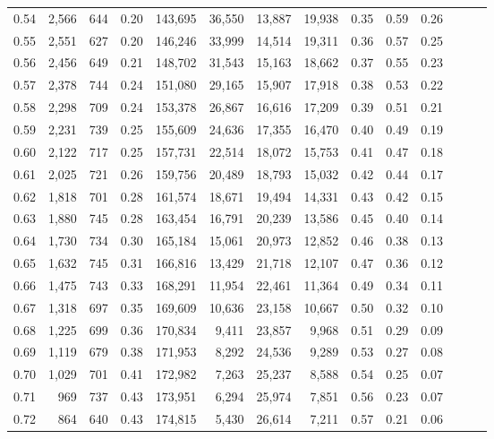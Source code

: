 \begin{tabular}{rrrrrrrrrrrrrr}
0.54 &  2,566 &  644 &  0.20 &  143,695 &   36,550 &  13,887 &  19,938 &  0.35 &  0.59 &      0.26 \\
0.55 &  2,551 &  627 &  0.20 &  146,246 &   33,999 &  14,514 &  19,311 &  0.36 &  0.57 &      0.25 \\
0.56 &  2,456 &  649 &  0.21 &  148,702 &   31,543 &  15,163 &  18,662 &  0.37 &  0.55 &      0.23 \\
0.57 &  2,378 &  744 &  0.24 &  151,080 &   29,165 &  15,907 &  17,918 &  0.38 &  0.53 &      0.22 \\
0.58 &  2,298 &  709 &  0.24 &  153,378 &   26,867 &  16,616 &  17,209 &  0.39 &  0.51 &      0.21 \\
0.59 &  2,231 &  739 &  0.25 &  155,609 &   24,636 &  17,355 &  16,470 &  0.40 &  0.49 &      0.19 \\
0.60 &  2,122 &  717 &  0.25 &  157,731 &   22,514 &  18,072 &  15,753 &  0.41 &  0.47 &      0.18 \\
0.61 &  2,025 &  721 &  0.26 &  159,756 &   20,489 &  18,793 &  15,032 &  0.42 &  0.44 &      0.17 \\
0.62 &  1,818 &  701 &  0.28 &  161,574 &   18,671 &  19,494 &  14,331 &  0.43 &  0.42 &      0.15 \\
0.63 &  1,880 &  745 &  0.28 &  163,454 &   16,791 &  20,239 &  13,586 &  0.45 &  0.40 &      0.14 \\
0.64 &  1,730 &  734 &  0.30 &  165,184 &   15,061 &  20,973 &  12,852 &  0.46 &  0.38 &      0.13 \\
0.65 &  1,632 &  745 &  0.31 &  166,816 &   13,429 &  21,718 &  12,107 &  0.47 &  0.36 &      0.12 \\
0.66 &  1,475 &  743 &  0.33 &  168,291 &   11,954 &  22,461 &  11,364 &  0.49 &  0.34 &      0.11 \\
0.67 &  1,318 &  697 &  0.35 &  169,609 &   10,636 &  23,158 &  10,667 &  0.50 &  0.32 &      0.10 \\
0.68 &  1,225 &  699 &  0.36 &  170,834 &    9,411 &  23,857 &   9,968 &  0.51 &  0.29 &      0.09 \\
0.69 &  1,119 &  679 &  0.38 &  171,953 &    8,292 &  24,536 &   9,289 &  0.53 &  0.27 &      0.08 \\
0.70 &  1,029 &  701 &  0.41 &  172,982 &    7,263 &  25,237 &   8,588 &  0.54 &  0.25 &      0.07 \\
0.71 &    969 &  737 &  0.43 &  173,951 &    6,294 &  25,974 &   7,851 &  0.56 &  0.23 &      0.07 \\
0.72 &    864 &  640 &  0.43 &  174,815 &    5,430 &  26,614 &   7,211 &  0.57 &  0.21 &      0.06 \\

\end{tabular}
